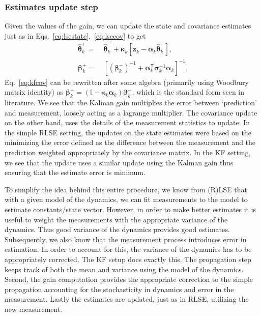 \documentclass{resonance}
\def\thh{\bm{\hat{\theta}}}
\def\z{\mathbf{z}}
\def\p{\bm{\beta}}
\def\K{\bm{\kappa}}
\def\T{\mathsf{T}}
\def\S{\bm{\sigma}}
\def\H{\bm{\alpha}}
\def\I{\mathbb{I}}
\begin{document}
\subsubsection*{Estimates update step}
Given the values of the gain, we can update the state and covariance estimates just as in Eqs.~\ref{eq:lsestate},~\ref{eq:lsecov} to get
\begin{align}
\thh_k^{+} =& \ \thh_k^{-} + \K_k[\z_k - \H_k \thh_k^{-}], \label{eq:kfstate} \\
\p_k^{+} =& \ [(\p_k^{-})^{-1} + \H_k^\T \S_k^{-1} \H_k]^{-1}. \label{eq:kfcov}
\end{align}
Eq.~\ref{eq:kfcov} can be rewritten after some algebra (primarily using Woodbury matrix identity) as $\p_k^{+} = (\I - \K_k \H_k)\p_k^-$, which is the standard form seen in literature. We see that the Kalman gain multiplies the error between `prediction' and measurement, loosely acting as a lagrange multiplier. The covariance update on the other hand, uses the details of the measurement statistics to update. In the simple RLSE setting, the updates on the state estimates were based on the minimizing the error defined as the difference between the measurement and the prediction weighted appropriately by the covariance matrix. In the KF setting, we see that the update uses a similar update using the Kalman gain thus ensuring that the estimate error is minimum.

To simplify the idea behind this entire procedure, we know from (R)LSE that with a given model of the dynamics, we can fit measurements to the model to estimate constants/state vector. However, in order to make better estimates it is useful to weight the measurements with the appropriate variance of the dynamics. Thus good variance of the dynamics provides good estimates. Subsequently, we also know that the measurement process introduces error in estimation. In order to account for this, the variance of the dynamics has to be appropriately corrected. The KF setup does exactly this. The propagation step keeps track of both the mean and variance using the model of the dynamics. Second, the gain computation provides the appropriate correction to the simple propagation accounting for the stochasticity in dynamics and error in the measurement. Lastly the estimates are updated, just as in RLSE, utilizing the new measurement. 
\end{document}

